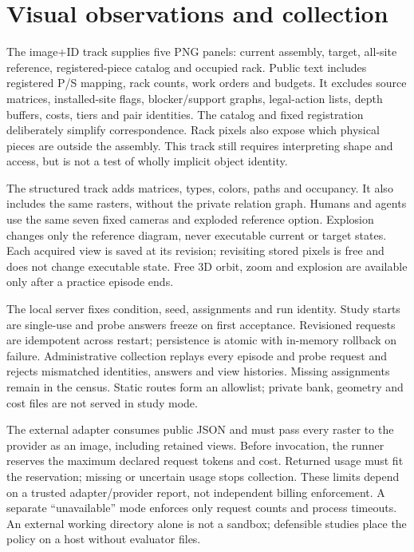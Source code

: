 \documentclass[10pt,twocolumn]{article}
\begin{document}
\section{Visual observations and collection}
The image+ID track supplies five PNG panels: current assembly, target,
all-site reference, registered-piece catalog and occupied rack.
Public text includes registered P/S mapping, rack counts, work orders and
budgets. It excludes source matrices, installed-site flags, blocker/support
graphs, legal-action lists, depth buffers, costs, tiers and pair identities.
The catalog and fixed registration deliberately simplify correspondence.
Rack pixels also expose which physical pieces are outside the assembly.
This track still requires interpreting shape and access, but is not a
test of wholly implicit object identity.

The structured track adds matrices, types, colors, paths and occupancy.
It also includes the same rasters, without the private relation graph.
Humans and agents use the same seven fixed cameras and exploded reference
option. Explosion changes only the reference diagram, never executable
current or target states. Each acquired view is saved at its revision;
revisiting stored pixels is free and does not change executable state.
Free 3D orbit, zoom and explosion are available only after a practice
episode ends.

The local server fixes condition, seed, assignments and run identity.
Study starts are single-use and probe answers freeze on first acceptance.
Revisioned requests are idempotent across restart; persistence is atomic
with in-memory rollback on failure. Administrative collection replays
every episode and probe request and rejects mismatched identities,
answers and view histories. Missing assignments remain in the census.
Static routes form an allowlist; private bank, geometry and cost files
are not served in study mode.

The external adapter consumes public JSON and must pass every raster to
the provider as an image, including retained views. Before invocation,
the runner reserves the maximum declared request tokens and cost.
Returned usage must fit the reservation; missing or uncertain usage stops
collection. These limits depend on a trusted adapter/provider report,
not independent billing enforcement. A separate ``unavailable'' mode
enforces only request counts and process timeouts. An external working
directory alone is not a sandbox; defensible studies place the policy
on a host without evaluator files.
\end{document}
